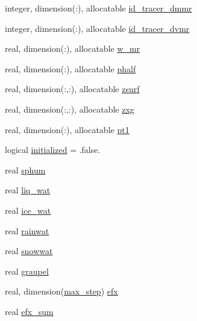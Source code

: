 \begin{DoxyCompactItemize}
integer, dimension(\-:), allocatable \hyperlink{structfv__arrays__mod_1_1fv__diag__type_ad80c8385277eadb39d47bb4d0e974ea8}{id\-\_\-tracer\-\_\-dmmr}
\item 
integer, dimension(\-:), allocatable \hyperlink{structfv__arrays__mod_1_1fv__diag__type_a0e8e7e25003ea55dc76c5dc77e1a990d}{id\-\_\-tracer\-\_\-dvmr}
\item 
real, dimension(\-:), allocatable \hyperlink{structfv__arrays__mod_1_1fv__diag__type_a4d259addb1c6c08c0227fe069d965ea3}{w\-\_\-mr}
\item 
real, dimension(\-:), allocatable \hyperlink{structfv__arrays__mod_1_1fv__diag__type_a1149e99cfa8d9a6cfe1ae1cfbfb5819c}{phalf}
\item 
real, dimension(\-:,\-:), allocatable \hyperlink{structfv__arrays__mod_1_1fv__diag__type_af067ded7c9f594b49e5014ccdd8f2ef2}{zsurf}
\item 
real, dimension(\-:,\-:), allocatable \hyperlink{structfv__arrays__mod_1_1fv__diag__type_a52e01f510a1a63071b116fa418a2fe36}{zxg}
\item 
real, dimension(\-:), allocatable \hyperlink{structfv__arrays__mod_1_1fv__diag__type_a32d7cfbed4a50c455ccca54ebed64b86}{pt1}
\item 
logical \hyperlink{structfv__arrays__mod_1_1fv__diag__type_ae727b4a8b7bcd2d4ca2e51fd71fe93c5}{initialized} = .false.
\item 
real \hyperlink{structfv__arrays__mod_1_1fv__diag__type_ab7170e3cf0bddbc87fe82585a9062b27}{sphum}
\item 
real \hyperlink{structfv__arrays__mod_1_1fv__diag__type_a762e21ac20112fb7a5e3b7ea5f14c0ff}{liq\-\_\-wat}
\item 
real \hyperlink{structfv__arrays__mod_1_1fv__diag__type_a08c5978581db62bd5f165873975b82da}{ice\-\_\-wat}
\item 
real \hyperlink{structfv__arrays__mod_1_1fv__diag__type_a3cc3219727d54802eb98783a7f1bd2a9}{rainwat}
\item 
real \hyperlink{structfv__arrays__mod_1_1fv__diag__type_af4f8361914400d6e1c225b9dea392d52}{snowwat}
\item 
real \hyperlink{structfv__arrays__mod_1_1fv__diag__type_a285a1994a61dfeb1cc4a2d41cb2daf58}{graupel}
\item 
real, dimension(\hyperlink{classfv__arrays__mod_a9e487a715273ca3c6572693756bcec1b}{max\-\_\-step}) \hyperlink{structfv__arrays__mod_1_1fv__diag__type_a3a82cb7f95dd84492be39b9aac99fd16}{efx}
\item 
real \hyperlink{structfv__arrays__mod_1_1fv__diag__type_ae15a07f9d6f051076e13dba74377e759}{efx\-\_\-sum}

\end{DoxyCompactItemize}
